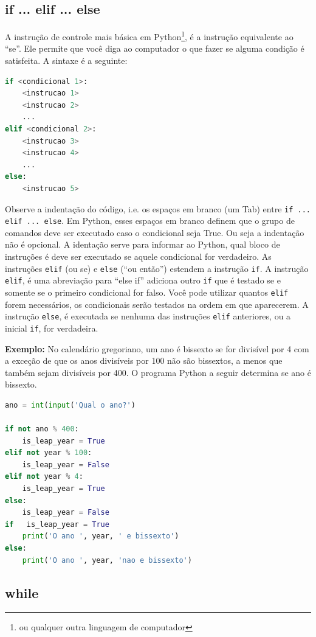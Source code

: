 \subsection{if ... elif ... else}

A instrução de controle mais básica em Python\footnote{ou qualquer outra linguagem de computador}, é a instrução equivalente ao ``se''. Ele permite que você diga ao computador o que fazer se alguma condição é satisfeita. A sintaxe é a seguinte:
\begin{lstlisting}[language=Python]
if <condicional 1>:
    <instrucao 1>
    <instrucao 2>
    ...
elif <condicional 2>:
    <instrucao 3>
    <instrucao 4>
    ...
else:
    <instrucao 5>
\end{lstlisting}
Observe a indentação do código, i.e. os espaços em branco (um Tab) entre {\tt if ... elif ... else}. Em Python, esses espaços em branco definem que o grupo de comandos deve ser executado caso o condicional seja True. Ou seja a indentação não é opcional. A identação serve para informar ao Python, qual bloco de instruções é deve ser executado se aquele condicional for verdadeiro. As instruções {\tt elif} (ou se) e {\tt else} (``ou então'') estendem a instrução {\tt if}. A instrução {\tt elif}, é uma abreviação para “else if” adiciona outro {\tt if} que é testado se e somente se o primeiro condicional for falso. Você pode utilizar quantos {\tt elif} forem necessários, os condicionais serão testados na ordem em que aparecerem. A instrução {\tt else}, é executada  se nenhuma das instruções {\tt elif} anteriores, ou a inicial {\tt if}, for verdadeira.

{\bf Exemplo:} No calendário gregoriano, um ano é bissexto se for divisível por 4 com a exceção de que os anos divisíveis por 100 não são bissextos, a menos que também sejam
divisíveis por 400. O programa Python a seguir determina se ano é bissexto.
\begin{lstlisting}[language=Python, frame=lines,basicstyle=\footnotesize, caption={Determinando se um ano é bissexto.}, label={lst:bissexto}]
ano = int(input('Qual o ano?')

if not ano % 400:
    is_leap_year = True
elif not year % 100:
    is_leap_year = False
elif not year % 4:
    is_leap_year = True
else:
    is_leap_year = False
if   is_leap_year = True
    print('O ano ', year, ' e bissexto')
else:
    print('O ano ', year, 'nao e bissexto')
\end{lstlisting}

\subsection{while}

